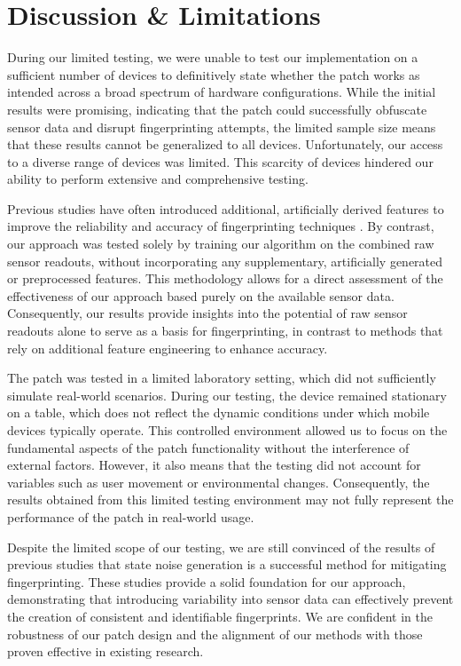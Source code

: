 \documentclass[11pt,
  oneside,openany,    %
]{scrreprt}
\begin{document}
\chapter{Discussion \& Limitations}
\label{chap:disc_and_limits}
During our limited testing, we were unable to test our implementation on a sufficient number of devices to definitively state whether the patch works as intended across a broad spectrum of hardware configurations.
While the initial results were promising, indicating that the patch could successfully obfuscate sensor data and disrupt fingerprinting attempts, the limited sample size means that these results cannot be generalized to all devices.
Unfortunately, our access to a diverse range of devices was limited.
This scarcity of devices hindered our ability to perform extensive and comprehensive testing.

Previous studies have often introduced additional, artificially derived features to improve the reliability and accuracy of fingerprinting techniques \cite{DBLP:journals/popets/DasBC18, DBLP:journals/tifs/ZhangBS21}.
By contrast, our approach was tested solely by training our algorithm on the combined raw sensor readouts, without incorporating any supplementary, artificially generated or preprocessed features.
This methodology allows for a direct assessment of the effectiveness of our approach based purely on the available sensor data.
Consequently, our results provide insights into the potential of raw sensor readouts alone to serve as a basis for fingerprinting, in contrast to methods that rely on additional feature engineering to enhance accuracy.

The patch was tested in a limited laboratory setting, which did not sufficiently simulate real-world scenarios.
During our testing, the device remained stationary on a table, which does not reflect the dynamic conditions under which mobile devices typically operate.
This controlled environment allowed us to focus on the fundamental aspects of the patch functionality without the interference of external factors. 
However, it also means that the testing did not account for variables such as user movement or environmental changes. 
Consequently, the results obtained from this limited testing environment may not fully represent the performance of the patch in real-world usage.

Despite the limited scope of our testing, we are still convinced of the results of previous studies that state noise generation is a successful method for mitigating fingerprinting.
These studies provide a solid foundation for our approach, demonstrating that introducing variability into sensor data can effectively prevent the creation of consistent and identifiable fingerprints.
We are confident in the robustness of our patch design and the alignment of our methods with those proven effective in existing research.
\end{document}
